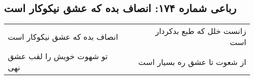 \begin{center}
\section*{رباعی شماره ۱۷۴: انصاف بده که عشق نیکوکار است}
\label{sec:0174}
\begin{longtable}{l p{0.5cm} r}
انصاف بده که عشق نیکوکار است
&&
زانست خلل که طبع بدکردار است
\\
تو شهوت خویش را لقب عشق نهی
&&
از شعوت تا عشق ره بسیار است
\\
\end{longtable}
\end{center}
